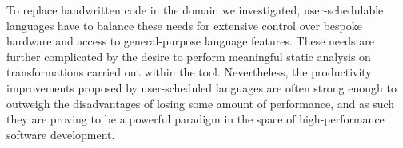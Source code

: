 \documentclass[acmsmall, nonacm=true]{acmart}
\begin{document}
To replace handwritten code in the domain we investigated, user-schedulable languages have to balance these needs for extensive control over bespoke hardware and access to general-purpose language features. These needs are further complicated by the desire to perform meaningful static analysis on transformations carried out within the tool. Nevertheless, the productivity improvements proposed by user-scheduled languages are often strong enough to outweigh the disadvantages of losing some amount of performance, and as such they are proving to be a powerful paradigm in the space of high-performance software development. 

\clearpage



\end{document}
